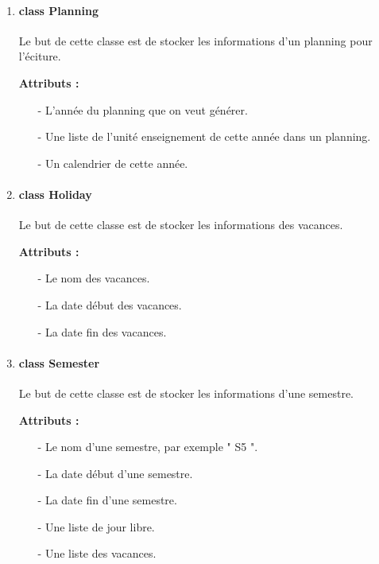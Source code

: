 \documentclass{polytech/polytech}
\begin{document}
\begin{enumerate}
			\item \paragraph{class Planning}

			Le but de cette classe est de stocker les informations d'un planning pour l'éciture.

			\textbf{Attributs :}
				\begin{itemize}
					\item[-] L'année du planning que on veut générer.
					\item[-] Une liste de l'unité enseignement de cette année dans un planning.
					\item[-] Un calendrier de cette année.
				\end{itemize}

			\item \paragraph{class Holiday}

			Le but de cette classe est de stocker les informations des vacances.

			\textbf{Attributs :}
				\begin{itemize}
					\item[-] Le nom des vacances.
					\item[-] La date début des vacances.
					\item[-] La date fin des vacances.
				\end{itemize}

			\item \paragraph{class Semester}

			Le but de cette classe est de stocker les informations d'une semestre.

			\textbf{Attributs :}
				\begin{itemize}
					\item[-] Le nom d'une semestre, par exemple " S5 ".
					\item[-] La date début d'une semestre.
					\item[-] La date fin d'une semestre.
					\item[-] Une liste de jour libre.
					\item[-] Une liste des vacances.
				\end{itemize}
		\end{enumerate}
		\pagebreak
\end{document}
